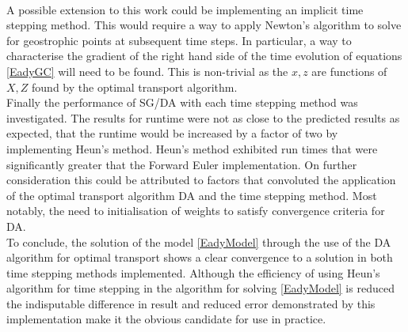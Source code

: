 \\
\linebreak
A possible extension to this work could be implementing an implicit time stepping method. This would require a way to apply Newton's algorithm to solve for geostrophic points at subsequent time steps. In particular, a way to characterise the gradient of the right hand side of the time evolution of equations \ref{EadyGC} will need to be found. This is non-trivial as the $x,z$ are functions of $X,Z$ found by the optimal transport algorithm.
\\
\linebreak
Finally the performance of SG/DA with each time stepping method was investigated. The results for runtime were not as close to the predicted results as expected, that the runtime would be increased by a factor of two by implementing Heun's method. Heun's method exhibited run times that were significantly greater that the Forward Euler implementation. On further consideration this could be attributed to factors that convoluted the application of the optimal transport algorithm DA and the time stepping method. Most notably, the need to initialisation of weights to satisfy convergence criteria for DA.
\\
\linebreak
To conclude, the solution of the model \ref{EadyModel} through the use of the DA algorithm for optimal transport shows a clear convergence to a solution in both time stepping methods implemented. Although the efficiency of using Heun's algorithm for time stepping in the algorithm for solving \ref{EadyModel} is reduced the indisputable difference in result and reduced error demonstrated by this implementation make it the obvious candidate for use in practice. 